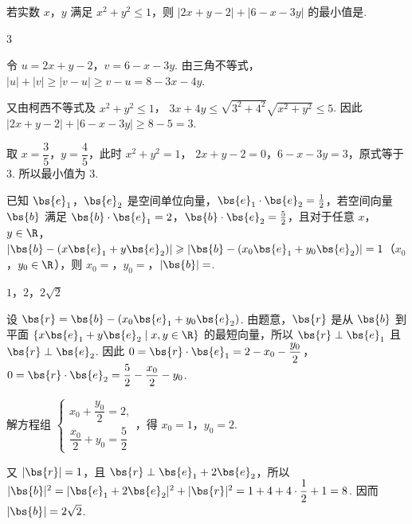 \begin{problem}
若实数 \(x\)，\(y\) 满足 \(x^{2} + y^{2} \leqslant 1\)，则 \(\left|2x + y - 2\right| + \left|6 - x - 3y\right|\) 的最小值是\fillinblank{}.
\end{problem}

\begin{answer}
\(3\)
\end{answer}

\begin{solution}
令 \(u=2x+y-2\)，\(v=6-x-3y\). 由三角不等式，
\(|u|+|v|\geqslant|v-u|\geqslant v-u=8-3x-4y\).

又由柯西不等式及 \(x^2+y^2\leqslant1\)，
\(3x+4y\leqslant\sqrt{3^2+4^2}\sqrt{x^2+y^2}\leqslant5\). 因此
\(|2x+y-2|+|6-x-3y|\geqslant8-5=3\).

取 \(x=\dfrac{3}{5}\)，\(y=\dfrac{4}{5}\)，此时 \(x^2+y^2=1\)，
\(2x+y-2=0\)，\(6-x-3y=3\)，原式等于 \(3\). 所以最小值为 \(3\).
\end{solution}

\begin{problem}
已知 \(\bs{e}_{1}\)，\(\bs{e}_{2}\) 是空间单位向量，\(\bs{e}_{1} \cdot \bs{e}_{2} = \frac{1}{2}\)，若空间向量 \( \bs{b} \) 满足 \( \bs{b} \cdot \bs{e}_{1} = 2\)，\( \bs{b} \cdot \bs{e}_{2} = \frac{5}{2}\)，且对于任意 \(x\)，\(y \in \R\)，\(\left|\bs{b} - (x \bs{e}_{1} + y \bs{e}_{2})\right| \geqslant \left|\bs{b} - (x_{0} \bs{e}_{1} + y_{0} \bs{e}_{2})\right| = 1\)（\(x_{0}\)，\(y_{0} \in \R\)），则 \(x_{0} =\)\fillinblank{}，\(y_{0} =\)\fillinblank{}，\(|\bs{b}| =\)\fillinblank{}.
\end{problem}

\begin{answer}
\(1\)，\(2\)，\(2\sqrt{2}\)
\end{answer}

\begin{solution}
设
\(\bs{r}=\bs{b}-(x_0\bs{e}_1+y_0\bs{e}_2)\). 由题意，\(\bs{r}\) 是从 \(\bs{b}\) 到平面
\(\{x\bs{e}_1+y\bs{e}_2\mid x,y\in\R\}\) 的最短向量，所以
\(\bs{r}\perp\bs{e}_1\) 且 \(\bs{r}\perp\bs{e}_2\). 因此
\(0=\bs{r}\cdot\bs{e}_1=2-x_0-\dfrac{y_0}{2}\)，
\(0=\bs{r}\cdot\bs{e}_2=\dfrac{5}{2}-\dfrac{x_0}{2}-y_0\).

解方程组
\(\begin{cases}
x_0+\dfrac{y_0}{2}=2,\\
\dfrac{x_0}{2}+y_0=\dfrac{5}{2}
\end{cases}\)，得 \(x_0=1\)，\(y_0=2\).

又 \(|\bs{r}|=1\)，且 \(\bs{r}\perp\bs{e}_1+2\bs{e}_2\)，所以
\(|\bs{b}|^2=|\bs{e}_1+2\bs{e}_2|^2+|\bs{r}|^2
=1+4+4\cdot\dfrac{1}{2}+1=8\). 因而 \(|\bs{b}|=2\sqrt{2}\).
\end{solution}


